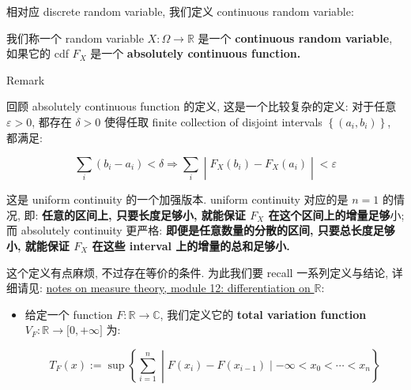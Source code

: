 相对应 discrete random variable, 我们定义 continuous random variable:

\begin{definition}{}

我们称一个 random variable \(\mathit{X}:\Omega\rightarrow\mathbb{R}\) 是一个 \textbf{continuous random variable}, 如果它的 cdf \(\mathit{F}_{\mathit{X}}\) 是一个 \textbf{absolutely continuous function.}

\end{definition}

\begin{qlremark}{Remark}

回顾 absolutely continuous function 的定义, 这是一个比较复杂的定义: 对于任意 \(\mathit{\varepsilon} > 0\), 都存在 \(\mathit{\delta} > 0\) 使得任取 finite collection of disjoint intervals \(\left\{ {(\mathit{a}_{\mathit{i}},\mathit{b}_{\mathit{i}})} \right\}\), 都满足:

\[\left. \sum\limits_{\mathit{i}}(\mathit{b}_{\mathit{i}} - \mathit{a}_{\mathit{i}}) < \mathit{\delta}\Longrightarrow\sum\limits_{\mathit{i}} \middle| \mathit{F}_{\mathit{X}}(\mathit{b}_{\mathit{i}}) - \mathit{F}_{\mathit{X}}(\mathit{a}_{\mathit{i}}) \middle| < \mathit{\varepsilon} \right.\]

这是 uniform continuity 的一个加强版本. uniform continuity 对应的是 \(\mathit{n} = 1\) 的情况, 即: \textbf{任意的区间上, 只要长度足够小, 就能保证 \(\mathit{F}_{\mathit{X}}\) 在这个区间上的增量足够}小; 而 absolutely continuity 更严格: \textbf{即便是任意数量的分散的区间, 只要总长度足够小, 就能保证 \(\mathit{F}_{\mathit{X}}\) 在这些 interval 上的增量的总和足够小.}

这个定义有点麻烦, 不过存在等价的条件. 为此我们要 recall 一系列定义与结论, 详细请见: \href{https://qiulinfan.github.io/mathnotes-measure_theory/12-differentiation_on_real_spaces.html}{notes on measure theory, module 12: differentiation on \(\mathbb{R}\)}:

\begin{itemize}
\item
  给定一个 function \(\mathit{F}:\mathbb{R}\rightarrow\mathbb{C}\), 我们定义它的 \textbf{total variation function} \(\mathit{V}_{\mathit{F}}:\mathbb{R}\rightarrow\lbrack 0, + \infty\rbrack\) 为:

  \[\mathit{T}_{\mathit{F}}(\mathit{x}) := \sup\left\{ \sum\limits_{\mathit{i} = 1}^{\mathit{n}} \middle| \mathit{F}(\mathit{x}_{\mathit{i}}) - \mathit{F}(\mathit{x}_{\mathit{i} - 1}) \mid - \infty < \mathit{x}_{0} < \cdots < \mathit{x}_{\mathit{n}} \right\}\]


\end{itemize}
\end{qlremark}
